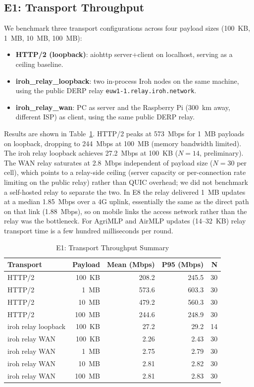 \documentclass[a4paper,fleqn]{cas-dc}
\begin{document}
\subsection{E1: Transport Throughput}
\label{sec:e1}

We benchmark three transport configurations across four payload sizes (100~KB, 1~MB, 10~MB, 100~MB):

\begin{itemize}
    \item \textbf{HTTP/2 (loopback)}: aiohttp server+client on localhost, serving as a ceiling baseline.
    \item \textbf{iroh\_relay\_loopback}: two in-process Iroh nodes on the same machine, using the public DERP relay \texttt{euw1-1.relay.iroh.network}.
    \item \textbf{iroh\_relay\_wan}: PC as server and the Raspberry Pi (300~km away, different ISP) as client, using the same public DERP relay.
\end{itemize}

Results are shown in Table~\ref{tab:e1}. HTTP/2 peaks at 573~Mbps for 1~MB payloads on loopback, dropping to 244~Mbps at 100~MB (memory bandwidth limited). The iroh relay loopback achieves 27.2~Mbps at 100~KB ($N{=}14$, preliminary). The WAN relay saturates at 2.8~Mbps independent of payload size ($N{=}30$ per cell), which points to a relay-side ceiling (server capacity or per-connection rate limiting on the public relay) rather than QUIC overhead; we did not benchmark a self-hosted relay to separate the two. In E8 the relay delivered 1~MB updates at a median 1.85~Mbps over a 4G uplink, essentially the same as the direct path on that link (1.88~Mbps), so on mobile links the access network rather than the relay was the bottleneck. For AgriMLP and AirMLP updates (14--32~KB) relay transport time is a few hundred milliseconds per round.

\begin{table}[t]
\centering
\caption{E1: Transport Throughput Summary}
\label{tab:e1}
\scriptsize
\setlength{\tabcolsep}{3.5pt}
\begin{tabular}{l r r r r}
\toprule
\textbf{Transport} & \textbf{Payload} & \textbf{Mean (Mbps)} & \textbf{P95 (Mbps)} & \textbf{N} \\
\midrule
HTTP/2               & 100~KB  & 208.2  & 245.5  & 30 \\
HTTP/2               & 1~MB    & 573.6  & 603.3  & 30 \\
HTTP/2               & 10~MB   & 479.2  & 560.3  & 30 \\
HTTP/2               & 100~MB  & 244.6  & 248.9  & 30 \\
\midrule
iroh relay loopback  & 100~KB  & 27.2   & 29.2   & 14 \\
\midrule
iroh relay WAN       & 100~KB  & 2.26   & 2.43   & 30 \\
iroh relay WAN       & 1~MB    & 2.75   & 2.79   & 30 \\
iroh relay WAN       & 10~MB   & 2.81   & 2.82   & 30 \\
iroh relay WAN       & 100~MB  & 2.81   & 2.83   & 30 \\
\bottomrule
\end{tabular}
\end{table}
\end{document}
